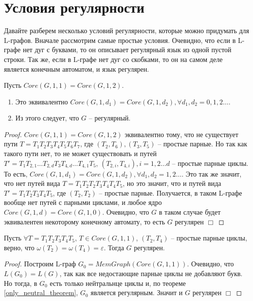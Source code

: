 \section{Условия регулярности}

Давайте разберем несколько условий регулярности, которые можно придумать для L-графов.
Вначале рассмотрим самые простые условия.
Очевидно, что если в L-графе нет дуг с буквами, то он описывает регулярный язык из одной пустой строки.
Так же, если в L-графе нет дуг со скобками, то он на самом деле является конечным автоматом, и язык регулярен.

\begin{theorem}
    Пусть $Core(G, 1, 1) = Core(G, 1, 2)$.
    \begin{enumerate}[label=\arabic*)]
        \item Это эквивалентно $Core(G, 1, d_1) = Core(G, 1, d_2), \forall d_1, d_2 = 0,1,2 \dots$.
        \item Из этого следует, что $G$ -- регулярный.
    \end{enumerate}
\end{theorem}
\label{only_neutral_theorem}

\begin{proof}
    $Core(G, 1, 1) = Core(G, 1, 2)$ эквивалентно тому, что не существует пути $T = T_1 T_2 T_3 T_4 T_5 T_6 T_7$,
    где $(T_2, T_6), (T_3, T_5)$ -- простые парные. Но так как такого пути нет, то не может существовать и путей
    $T' = T_1 T_{2,1} \dots T_{2,d} T_3 T_{4,d} \dots T_{4,1} T_5$, $(T_{2,i},T_{4,i}), i=1,2 \dots d$ -- простые парные циклы.
    То есть, $Core(G, 1, d_1) = Core(G, 1, d_2), \forall d_1, d_2 = 1,2 \dots$.
    Это так же значит, что нет путей вида $T = T_1 T_2 T_2 T_3 T_4 T_4 T_5$, но это значит, что и путей вида $T' = T_1 T_2 T_3 T_4 T_5$,
    где $(T_2,T_2)$ -- простые парные. Получается, в таком L-графе вообще нет путей с парными циклами, и любое ядро $Core(G, 1, d) = Core(G, 1, 0)$.
    Очевидно, что $G$ в таком случае будет эквивалентен некоторому конечному автомату, то есть $G$ регулярен $\Box$
\end{proof}

\begin{theorem}
    Пусть $\forall T = T_1 T_2 T_3 T_4 T_5$, $T \in Core(G, 1, 1)$, $(T_2, T_4)$ -- простые парные циклы, 
    верно, что $\omega(T_2) = \omega(T_4) = \varepsilon$.
    Тогда $G$ регулярен. 
\end{theorem}
\label{no_letters_on_loops_theorem}

\begin{proof}
    Построим L-граф $G_0 = MemGraph(Core(G,1,1))$. Очевидно, что $L(G_0) = L(G)$, так как все недостающие парные циклы не добавляют букв.
    Но тогда, в $G_0$ есть только нейтральнце циклы и, по теореме \ref{only_neutral_theorem}, $G_0$ является регулярным.
    Значит и $G$ регулярен $\Box$
\end{proof}

